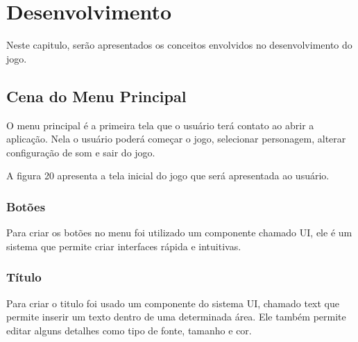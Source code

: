 \chapter{Desenvolvimento}
\label{cap:desenvolvimento}


Neste capitulo, serão apresentados os conceitos envolvidos no desenvolvimento do jogo.

\section{Cena do Menu Principal}
O menu principal é a primeira tela que o usuário terá contato ao abrir a aplicação. Nela o usuário poderá começar o jogo, selecionar personagem, alterar configuração de som e sair do jogo.

A figura 20 apresenta a tela inicial do jogo que será apresentada ao usuário.

\begin{figure}[h!]
		\centering
	\end{figure}
	
\subsection{Botões}
Para criar os botões no menu foi utilizado um componente chamado UI, ele é um sistema que permite criar interfaces rápida e intuitivas. 

\subsection{Título }
Para criar o titulo foi usado um componente do sistema UI, chamado text que permite inserir um texto dentro de uma determinada área. Ele também permite editar alguns detalhes como tipo de fonte, tamanho e cor.

